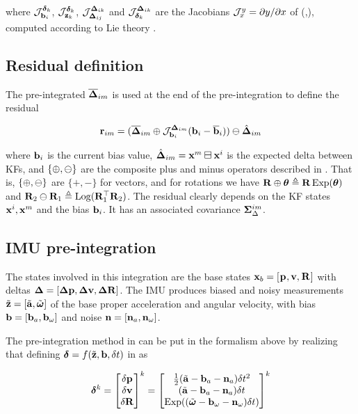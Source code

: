 where ${\mathcal{J}^{\bm\delta_k}_{{\bf b}_i}}$, ${\mathcal{J}^{\bm\delta_k}_{{\bf z}_k}}$, ${\mathcal{J}^{{\bm \Delta}_{ik}}_{{\bm \Delta}_{ij}}}$ and ${\mathcal{J}^{{\bm \Delta}_{ik}}_{\bm\delta_k}}$ 
are the Jacobians ${\mathcal{J}^{y}_{x}}=\partial y/\partial x$ of (,), computed according to Lie theory \cite{sola2018micro}.


\subsection{Residual definition}
\label{sec:preint_residual}

The pre-integrated $\overline{{\bm \Delta}}_{im}$ is used at the end of the pre-integration to define the residual

\begin{align}
    {\bf r}_{im} = (\overline{{\bm \Delta}}_{im} \oplus {\mathcal{J}^{{\bm \Delta}_{im}}_{{\bf b}_i}}({\bf b}_i-\overline{{\bf b}}_i) ) \ominus \hat{{\bm \Delta}}_{im}
    \label{eq:preint_residual}
\end{align}

where ${\bf b}_i$ is the current bias value,  $\hat{{\bm \Delta}}_{im}={\bf x}^m\boxminus{\bf x}^i$ is the expected delta between KFs, and $\{\oplus,\ominus\}$ are the composite
 plus and minus operators described in \cite{sola2018micro}. 
That is, $\{\oplus,\ominus\}$ are $\{+,-\}$ for vectors, and for rotations we have ${\bf R}\oplus\bm\theta\triangleq{\bf R}\operatorname*{Exp}(\bm\theta)$ and ${\bf R}_2\ominus{\bf R}_1\triangleq\operatorname*{Log}({\bf R}_1^{\top}{\bf R}_2)$. 
The residual clearly depends on the KF states ${\bf x}^i,{\bf x}^m$ and the bias ${\bf b}_i$. It has an associated covariance  ${\bm \Sigma}_\Delta^{im}$.



\subsection{IMU pre-integration}

The states involved in this integration are the base states ${\bf x}_b = [\prescript{}{}{{\bf p}}_{}, {\bf v}, \prescript{}{}{{\bf R}}_{}]$ with deltas ${\bm \Delta}=[{\bm \Delta {\bf p}},{\bm \Delta {\bf v}},{\bm \Delta {\bf R}}]$. 
The IMU produces biased and noisy measurements $\tilde{{\bf z}} = [\tilde{{\bf a}}, \tilde{{\bm \omega}}]$ of the base proper acceleration and angular velocity, 
with bias ${\bf b} = [{\bf b}_{a}, {\bf b}_{\omega}]$ and noise ${\bf n} = [{\bf n}_{a}, {\bf n}_{\omega}]$. 

The pre-integration method in  \cite{forster2017-TRO} can be put in the formalism above by realizing that defining $\bm\delta=f(\tilde{{\bf z}},{\bf b},\delta t)$ in  as

\begin{align}
    \bm\delta^k = \begin{bmatrix}
    \delta{\bf p}\\\delta{\bf v}\\\delta{\bf R}
    \end{bmatrix}^k =
    \begin{bmatrix}
    \tfrac12(\tilde{{\bf a}}-{\bf b}_a-{\bf n}_a)\delta t^2 \\
    (\tilde{{\bf a}}-{\bf b}_a-{\bf n}_a)\delta t \\
    \operatorname*{Exp}((\tilde{{\bm \omega}}-{\bf b}_\omega-{\bf n}_\omega)\delta t)
    \end{bmatrix}^k
\end{align}

